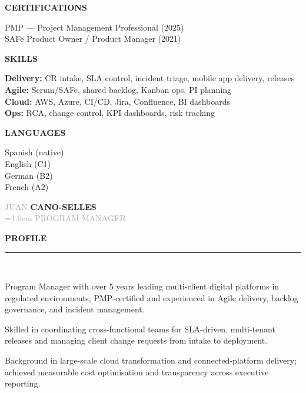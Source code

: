 \documentclass[12pt,a4paper]{article}
\newcommand{\headleft}[1]{%
  \vspace*{2ex}\textsc{\textbf{\color{softwhite}#1}}\par%
  \vspace*{-1.2ex}{\color{softwhite}\hrulefill}\par\vspace*{0.8ex}
}
\newcommand{\headright}[1]{%
  \vspace{0.6ex}%
  {\sffont\bfseries\large\addfontfeatures{LetterSpace=2.0}\textcolor{cvblue}{\MakeUppercase{#1}}}\\[-1ex]%
  {\color{cvblue}\rule{\dimexpr\linewidth\relax}{0.6pt}}\\[-0.6ex]%
}
\newlength{\SideBarW}
\begin{document}
\begin{minipage}[t]{\textwidth}
{{\begin{minipage}[t]{\dimexpr\linewidth-8mm\relax}
      \vspace*{2.5mm}
      \headleft{CERTIFICATIONS}
      PMP — Project Management Professional (2025)\\[0.4ex]
      SAFe Product Owner / Product Manager (2021)

      \vspace*{2.5mm}
\headleft{SKILLS}
\textbf{Delivery:} CR intake, SLA control, incident triage, mobile app delivery, releases\\[0.3ex]
\textbf{Agile:} Scrum/SAFe, shared backlog, Kanban ops, PI planning\\[0.3ex]
\textbf{Cloud:} AWS, Azure, CI/CD, Jira, Confluence, BI dashboards\\[0.3ex]
\textbf{Ops:} RCA, change control, KPI dashboards, risk tracking

      \vspace*{2.5mm}
      \headleft{LANGUAGES}
      Spanish (native)\\
      English (C1)\\
      German (B2)\\
      French (A2)

    \end{minipage}
  }%
}%
\hspace{4mm}%
\begin{minipage}[t]{\dimexpr\textwidth-\SideBarW-4mm\relax}
  \raggedright
  \setlength{\parskip}{0.45ex}

\vspace*{14mm}
\begin{center}
  {\sffont\fontsize{38}{40}\textcolor{darkgray}{JUAN}}%
  \hspace{1.1em}%
  {\sffont\fontsize{38}{40}\bfseries{}\textcolor{cvblue}{CANO-SELLES}}\\[1.8ex]
  {\sffont\fontsize{15}{17}\textcolor{darkgray}{\spaceskip=1.0em PROGRAM MANAGER}}
\end{center}

\vspace{2mm}
\headright{Profile}
\begin{cvitemize}
  \item Program Manager with over 5 years leading multi-client digital platforms in regulated environments; PMP-certified and experienced in Agile delivery, backlog governance, and incident management.
  \item Skilled in coordinating cross-functional teams for SLA-driven, multi-tenant releases and managing client change requests from intake to deployment.
  \item Background in large-scale cloud transformation and connected-platform delivery; achieved measurable cost optimisation and transparency across executive reporting.
\end{cvitemize}


\end{minipage}
\end{minipage}
\end{document}
